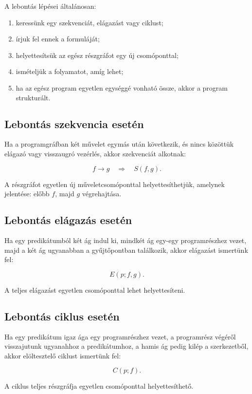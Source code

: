 A lebontás lépései általánosan:

\begin{enumerate}
  \item keressünk egy szekvenciát, elágazást vagy ciklust;
  \item írjuk fel ennek a formuláját;
  \item helyettesítsük az egész részgráfot egy új csomóponttal;
  \item ismételjük a folyamatot, amíg lehet;
  \item ha az egész program egyetlen egységgé vonható össze, akkor a program strukturált.
\end{enumerate}

\subsection{Lebontás szekvencia esetén}

Ha a programgráfban két művelet egymás után következik, és nincs közöttük elágazó vagy visszaugró vezérlés, akkor szekvenciát alkotnak:

\[
f\rightarrow g \quad \Rightarrow \quad S(f,g).
\]

A részgráfot egyetlen új műveletcsomóponttal helyettesíthetjük, amelynek jelentése: előbb $f$, majd $g$ végrehajtása.

\subsection{Lebontás elágazás esetén}

Ha egy predikátumból két ág indul ki, mindkét ág egy-egy programrészhez vezet, majd a két ág ugyanabban a gyűjtőpontban találkozik, akkor elágazást ismertünk fel:

\[
E(p;f,g).
\]

A teljes elágazást egyetlen csomóponttal lehet helyettesíteni.

\subsection{Lebontás ciklus esetén}

Ha egy predikátum igaz ága egy programrészhez vezet, a programrész végéről visszajutunk ugyanahhoz a predikátumhoz, a hamis ág pedig kilép a szerkezetből, akkor elöltesztelő ciklust ismertünk fel:

\[
C(p;f).
\]

A ciklus teljes részgráfja egyetlen csomóponttal helyettesíthető.

